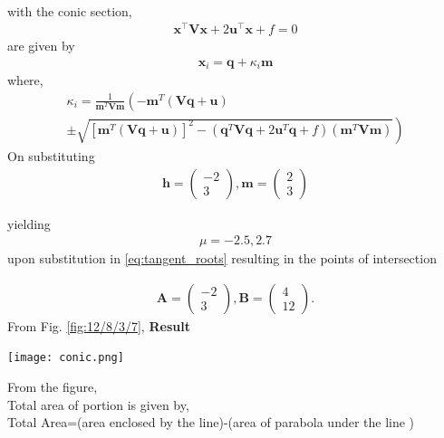 \documentclass[10pt,a4paper]{report}
\newcommand{\myvec}[1]{\ensuremath{\begin{pmatrix}#1\end{pmatrix}}}
\let\vec\mathbf
\let\vec\mathbf
\providecommand{\brak}[1]{\ensuremath{\left(#1\right)}}
\providecommand{\lbrak}[1]{\ensuremath{\left(#1\right.}}
\providecommand{\rbrak}[1]{\ensuremath{\left.#1\right)}}
\providecommand{\sbrak}[1]{\ensuremath{{}\left[#1\right]}}
\begin{document}
\begin{multicols}{2}
\begin{align}
\end{align}
with the conic section, \\ 
\begin{align}
	\vec{x}^{\top}\vec{V}\vec{x} + 2\vec{u}^{\top} \vec{x} + f = 0
\end{align}
are given by \\
\begin{align}
\vec{x}_i = \vec{q} + \kappa_i \vec{m}
\end{align}
where, \\
{\tiny
\begin{multline}
\kappa_i = \frac{1}
{
\vec{m}^T\vec{V}\vec{m}
}
\lbrak{-\vec{m}^T\brak{\vec{V}\vec{q}+\vec{u}}}
\\
\pm
\rbrak{\sqrt{
\sbrak{
\vec{m}^T\brak{\vec{V}\vec{q}+\vec{u}}
}^2
-
\brak
{
\vec{q}^T\vec{V}\vec{q} + 2\vec{u}^T\vec{q} +f
}
\brak{\vec{m}^T\vec{V}\vec{m}}
}
}
\end{multline}
}
On substituting\\
\fi
\begin{align}
\vec{h} = \myvec{
-2\\
3
},
\vec{m} = \myvec{2 \\ 3}
\end{align}

yielding
\begin{align}
    \mu=-2.5,2.7
\end{align}
upon substitution in \eqref{eq:tangent_roots}
resulting in the points of intersection

\begin{align}
    \vec{A}=\myvec{
-2\\
3
    },
    \vec{B}=\myvec{
4\\
12
    }.
\end{align}
From Fig. 
		\ref{fig:12/8/3/7},
		\iffalse
\textbf{Result}
\begin{center}
 \texttt{[image: conic.png]}    
 \end{center}\vspace{1mm}
 From the figure,\\ \vspace{1mm}
Total area of portion is given by, \\ \vspace{1mm}
Total Area=(area enclosed by the line)-(area of parabola under the line )


\end{multicols}
\end{document}
